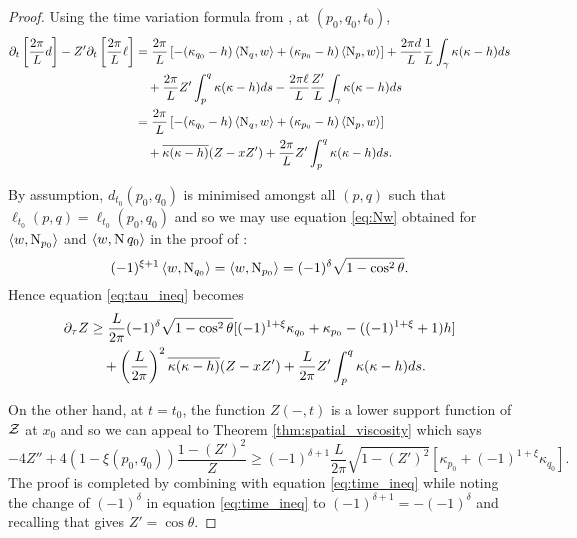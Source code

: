 \documentclass[a4paper, 12pt]{amsart}
\begin{document}
\begin{proof}
Using the time variation formula from , at \((p_0, q_0, t_0)\),
\[
\begin{split}
\partial_t \left[\frac{2\pi}{L} d\right] - Z' \partial_t \left[\frac{2\pi}{L}\ell\right] &= \frac{2\pi}{L}\left[-(\kappa_{q_0}-h) \left\langle \operatorname{N}_q,w \right\rangle + (\kappa_{p_0}-h) \left\langle \operatorname{N}_p,w \right\rangle\right] + \frac{2\pi d}{L} \frac{1}{L} \int_{\gamma} \kappa(\kappa-h) ds \\
&\quad + \frac{2\pi}{L} Z' \int_p^q \kappa(\kappa-h) ds - \frac{2\pi\ell}{L} \frac{Z'}{L} \int_{\gamma}\kappa(\kappa-h) ds \\
&= \frac{2\pi}{L}\left[-(\kappa_{q_0}-h) \left\langle \operatorname{N}_q,w \right\rangle + (\kappa_{p_0}-h) \left\langle \operatorname{N}_p,w \right\rangle\right] \\
&\quad + \overline{{\kappa(\kappa-h)}} (Z - x Z') + \frac{2\pi}{L} Z' \int_p^q \kappa(\kappa-h) ds.
\end{split}
\]

By assumption, \(d_{t_0} (p_0, q_0)\) is minimised amongst all \((p, q)\) such that \(\ell_{t_0}(p, q) = \ell_{t_0}(p_0, q_0)\) and so we may use equation \eqref{eq:Nw} obtained for $\left\langle w,\operatorname{N}_{p_0} \right\rangle$ and $\left\langle w,\operatorname{N}{q_0} \right\rangle$ in the proof of :
\[
(-1)^{\xi+1} \left\langle w,\operatorname{N}_{q_0} \right\rangle = \left\langle w,\operatorname{N}_{p_0} \right\rangle =  (-1)^\delta \sqrt{1-\cos^2\theta}.
\]
Hence equation \eqref{eq:tau_ineq} becomes
\begin{equation}
\label{eq:time_ineq}
\begin{split}
\partial_{\tau} Z &\geq \frac{L}{2\pi} (-1)^\delta \sqrt{1-\cos^2\theta} [(-1)^{1+\xi}\kappa_{q_0} + \kappa_{p_0} - ((-1)^{1+\xi} + 1)h] \\
&\quad + \left(\frac{L}{2\pi}\right)^2 \overline{{\kappa(\kappa-h)}} (Z - x Z') + \frac{L}{2\pi} Z' \int_p^q \kappa(\kappa-h) ds.
\end{split}
\end{equation}

On the other hand, at $t=t_0$, the function $Z(-, t)$ is a lower support function of $\operatorname{\mathcal{Z}}$ at $x_0$ and so we can appeal to Theorem \ref{thm:spatial_viscosity} which says
\[
-4Z'' + 4(1-\xi(p_0,q_0)) \frac{1 - (Z')^2}{Z} \geq (-1)^{\delta+1} \frac{L}{2\pi} \sqrt{1 - (Z')^2} \left[\kappa_{p_0} + (-1)^{1+\xi} \kappa_{q_0}\right].
\]
The proof is completed by combining with equation \eqref{eq:time_ineq} while noting the change of \((-1)^{\delta}\) in equation \eqref{eq:time_ineq} to \((-1)^{\delta + 1} = -(-1)^{\delta}\) and recalling that  gives \(Z' = \cos\theta\).
\end{proof}
\end{document}
